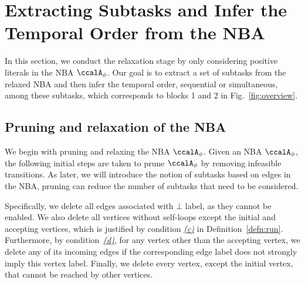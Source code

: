 \documentclass[Afour,sageh,times]{sagej}
\newcommand{\autop}{\ccalA_{\phi}}
\begin{document}
{\section{Extracting Subtasks and Infer the Temporal Order from the NBA}\label{sec:app}
In this section, we conduct the relaxation stage by only considering positive literals in the NBA $\autop$. Our goal is to extract a set of subtasks from the relaxed NBA  and then infer the temporal order, sequential or simultaneous, among these subtasks, which corresponds to blocks 1 and 2 in Fig.~\ref{fig:overview}.
\subsection{{Pruning and relaxation of the NBA}}\label{sec:prune}

We begin with pruning and relaxing the NBA $\autop$. Given an NBA $\autop$, the following initial steps are taken to prune $\autop$ by removing infeasible transitions. As later, we will introduce the notion of subtasks based on edges in the NBA, pruning can reduce the number of subtasks that need to be considered.

Specifically, we delete all edges associated with $\bot$ label, as they cannot be enabled.  We also delete all vertices without self-loops except the initial and accepting vertices, which is justified by condition \hyperref[cond:c]{\it (c)} in Definition~\ref{defn:run}. Furthermore, by condition~\hyperref[cond:d]{\it (d)}, for any vertex other than the accepting vertex, we delete any of its incoming edges if the corresponding edge label does not strongly imply this vertex label. Finally, we delete every vertex, except the initial vertex, that cannot be reached by other vertices.

}
\end{document}
